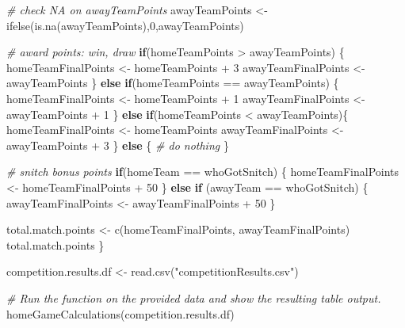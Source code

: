 \documentclass[
]{article}
\newenvironment{Shaded}{\begin{snugshade}}{\end{snugshade}}
\newcommand{\CommentTok}[1]{\textcolor[rgb]{0.56,0.35,0.01}{\textit{#1}}}
\newcommand{\ControlFlowTok}[1]{\textcolor[rgb]{0.13,0.29,0.53}{\textbf{#1}}}
\newcommand{\DecValTok}[1]{\textcolor[rgb]{0.00,0.00,0.81}{#1}}
\newcommand{\FunctionTok}[1]{\textcolor[rgb]{0.00,0.00,0.00}{#1}}
\newcommand{\NormalTok}[1]{#1}
\newcommand{\OtherTok}[1]{\textcolor[rgb]{0.56,0.35,0.01}{#1}}
\newcommand{\SpecialCharTok}[1]{\textcolor[rgb]{0.00,0.00,0.00}{#1}}
\newcommand{\StringTok}[1]{\textcolor[rgb]{0.31,0.60,0.02}{#1}}
\begin{document}
\begin{Shaded}
\begin{Highlighting}[]
  \CommentTok{\# check NA on awayTeamPoints}
\NormalTok{  awayTeamPoints }\OtherTok{\textless{}{-}} \FunctionTok{ifelse}\NormalTok{(}\FunctionTok{is.na}\NormalTok{(awayTeamPoints),}\DecValTok{0}\NormalTok{,awayTeamPoints)}
  
  \CommentTok{\# award points: win, draw}
  \ControlFlowTok{if}\NormalTok{(homeTeamPoints }\SpecialCharTok{\textgreater{}}\NormalTok{ awayTeamPoints) \{}
\NormalTok{    homeTeamFinalPoints }\OtherTok{\textless{}{-}}\NormalTok{ homeTeamPoints }\SpecialCharTok{+} \DecValTok{3}
\NormalTok{    awayTeamFinalPoints }\OtherTok{\textless{}{-}}\NormalTok{ awayTeamPoints}
\NormalTok{  \} }\ControlFlowTok{else} \ControlFlowTok{if}\NormalTok{(homeTeamPoints }\SpecialCharTok{==}\NormalTok{ awayTeamPoints) \{}
\NormalTok{    homeTeamFinalPoints }\OtherTok{\textless{}{-}}\NormalTok{ homeTeamPoints }\SpecialCharTok{+} \DecValTok{1}
\NormalTok{    awayTeamFinalPoints }\OtherTok{\textless{}{-}}\NormalTok{ awayTeamPoints }\SpecialCharTok{+} \DecValTok{1}
\NormalTok{  \} }\ControlFlowTok{else} \ControlFlowTok{if}\NormalTok{(homeTeamPoints }\SpecialCharTok{\textless{}}\NormalTok{ awayTeamPoints)\{}
\NormalTok{    homeTeamFinalPoints }\OtherTok{\textless{}{-}}\NormalTok{ homeTeamPoints}
\NormalTok{    awayTeamFinalPoints }\OtherTok{\textless{}{-}}\NormalTok{ awayTeamPoints }\SpecialCharTok{+} \DecValTok{3}
\NormalTok{  \} }\ControlFlowTok{else}\NormalTok{ \{}
    \CommentTok{\# do nothing}
\NormalTok{  \}}
  
  \CommentTok{\# snitch bonus points}
  \ControlFlowTok{if}\NormalTok{(homeTeam }\SpecialCharTok{==}\NormalTok{ whoGotSnitch) \{}
\NormalTok{    homeTeamFinalPoints }\OtherTok{\textless{}{-}}\NormalTok{ homeTeamFinalPoints }\SpecialCharTok{+} \DecValTok{50}
\NormalTok{  \} }\ControlFlowTok{else} \ControlFlowTok{if}\NormalTok{ (awayTeam }\SpecialCharTok{==}\NormalTok{ whoGotSnitch) \{}
\NormalTok{    awayTeamFinalPoints }\OtherTok{\textless{}{-}}\NormalTok{ awayTeamFinalPoints }\SpecialCharTok{+} \DecValTok{50}
\NormalTok{  \}}

\NormalTok{  total.match.points }\OtherTok{\textless{}{-}} \FunctionTok{c}\NormalTok{(homeTeamFinalPoints, awayTeamFinalPoints)}
\NormalTok{  total.match.points}
\NormalTok{\}}

\NormalTok{competition.results.df }\OtherTok{\textless{}{-}} \FunctionTok{read.csv}\NormalTok{(}\StringTok{"competitionResults.csv"}\NormalTok{)}
  
\CommentTok{\# Run the function on the provided data and show the resulting table output.}
\FunctionTok{homeGameCalculations}\NormalTok{(competition.results.df)}
\end{Highlighting}
\end{Shaded}
\end{document}
